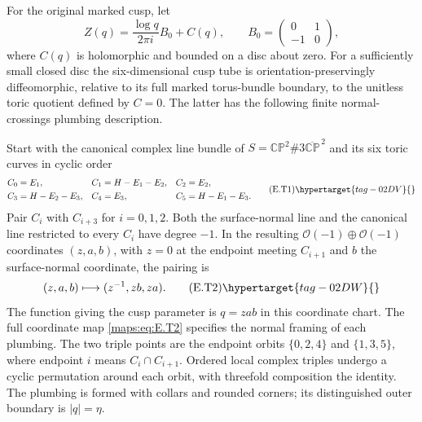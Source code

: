 \begin{proposition}\hypertarget{tag-02MJ}{}\label{maps:src:E.2.19}


For the original marked cusp, let
\[
 Z(q)=\frac{\log q}{2\pi i}B_0+C(q),\qquad
 B_0=\begin{pmatrix}0&1\\-1&0\end{pmatrix},
\]
where $C(q)$ is holomorphic and bounded on a disc about zero.
For a sufficiently small closed disc the six-dimensional
cusp tube is orientation-preservingly diffeomorphic, relative to
its full marked torus-bundle boundary, to the unitless toric
quotient defined by $C=0$.  The latter has the following finite
normal-crossings plumbing description.

Start with the canonical complex line bundle of
$S=\mathbb {CP}^2\#3\overline{\mathbb {CP}}^{\,2}$ and its six
toric curves in cyclic order
\[
 \begin{aligned}
 C_0&=E_1,& C_1&=H-E_1-E_2,& C_2&=E_2,\\
 C_3&=H-E_2-E_3,& C_4&=E_3,& C_5&=H-E_1-E_3.
 \end{aligned}
 \tag{E.T1}\hypertarget{tag-02DV}{}\label{maps:eq:E.T1}
\]
Pair $C_i$ with $C_{i+3}$ for $i=0,1,2$.  Both the surface-normal
line and the canonical line restricted to every $C_i$ have degree
$-1$.  In the resulting $\mathcal O(-1)\oplus\mathcal O(-1)$
coordinates $(z,a,b)$, with $z=0$ at the endpoint meeting
$C_{i+1}$ and $b$ the surface-normal coordinate, the pairing is
\[
             (z,a,b)\longmapsto(z^{-1},zb,za).
 \tag{E.T2}\hypertarget{tag-02DW}{}\label{maps:eq:E.T2}
\]
The function giving the cusp parameter is $q=zab$ in this
coordinate chart.  The full coordinate map \eqref{maps:eq:E.T2} specifies the normal
framing of each plumbing.
The two triple points are the endpoint orbits
$\{0,2,4\}$ and $\{1,3,5\}$, where endpoint $i$ means
$C_i\cap C_{i+1}$.  Ordered local complex triples undergo a
cyclic permutation around each orbit, with threefold composition
the identity.  The plumbing is formed with collars and rounded
corners; its distinguished outer boundary is $|q|=\eta$.

\end{proposition}


